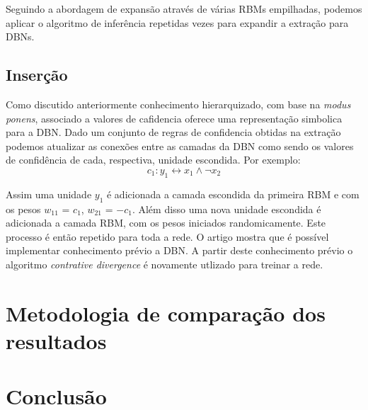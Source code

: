 \documentclass[a4paper, 12pt]{article}
\begin{document}
    Seguindo a abordagem de expansão através de várias RBMs empilhadas, podemos aplicar o algoritmo de inferência\cite{Tran} repetidas vezes para expandir a extração para DBNs.
    
    \subsection{Inserção}
    
    Como discutido anteriormente conhecimento hierarquizado, com base na \textit{modus ponens}, associado a valores de cafidencia oferece uma representação simbolica para a DBN\cite{Tran}. Dado um conjunto de regras de confidencia obtidas na extração podemos atualizar as conexões entre as camadas da DBN como sendo os valores de confidência de cada, respectiva, unidade escondida. Por exemplo: 
    \begin{equation}
        c_1 : y_1 \leftrightarrow x_1 \wedge \neg x_2
    \end{equation}
    
    Assim uma unidade $y_1$ é adicionada a camada escondida da primeira RBM e com os pesos $w_11$ = $c_1$, $w_21$ = $-c_1$. Além disso uma nova unidade escondida é adicionada a camada RBM, com os pesos iniciados randomicamente. Este processo é então repetido para toda a rede.  O artigo mostra que é possível implementar conhecimento prévio a DBN. A partir deste conhecimento prévio o algoritmo \textit{contrative divergence} é novamente utlizado para treinar a rede.
    
    \section{Metodologia de comparação dos resultados}
    \section{Conclusão}
    
\end{document}

